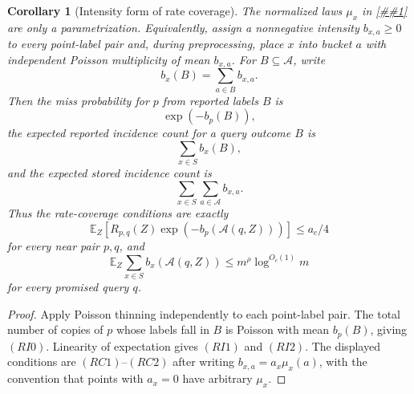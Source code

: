 \documentclass[10pt]{article}
\newcommand{\cref}[1]{\ref{##1}}
\newtheorem{corollary}[theorem]{Corollary}
\theoremstyle{definition}
\newcommand{\E}{\mathbb{E}}
\begin{document}
\begin{corollary}[Intensity form of rate coverage]
   \label{cor:rate-coverage-intensity}
   The normalized laws \(\mu_x\) in \cref{lem:poisson-rate-coverage} are only a
   parametrization.  Equivalently, assign a nonnegative intensity
   \(b_{x,a}\ge0\) to every point-label pair and, during preprocessing, place
   \(x\) into bucket \(a\) with independent Poisson multiplicity of mean
   \(b_{x,a}\).  For \(B\subseteq\mathcal A\), write
   \[
      b_x(B)=\sum_{a\in B}b_{x,a}.
   \]
   Then the miss probability for \(p\) from reported labels \(B\) is
   \[
      \exp(-b_p(B)),
      \tag{RI0}
   \]
   the expected reported incidence count for a query outcome \(B\) is
   \[
      \sum_{x\in S}b_x(B),
      \tag{RI1}
   \]
   and the expected stored incidence count is
   \[
      \sum_{x\in S}\sum_{a\in\mathcal A}b_{x,a}.
      \tag{RI2}
   \]
   Thus the rate-coverage conditions are exactly
   \[
      \E_Z\left[
         R_{p,q}(Z)\exp(-b_p(\mathcal A(q,Z)))
      \right]\le a_c/4
      \tag{RI3}
   \]
   for every near pair \(p,q\), and
   \[
      \E_Z
      \sum_{x\in S}b_x(\mathcal A(q,Z))
      \le m^\rho\log^{O_c(1)}m
      \tag{RI4}
   \]
   for every promised query \(q\).
\end{corollary}

\begin{proof}
   Apply Poisson thinning independently to each point-label pair.  The total
   number of copies of \(p\) whose labels fall in \(B\) is Poisson with mean
   \(b_p(B)\), giving \((RI0)\).  Linearity of expectation gives
   \((RI1)\) and \((RI2)\).  The displayed conditions are \((RC1)\)--\((RC2)\)
   after writing \(b_{x,a}=a_x\mu_x(a)\), with the convention that points with
   \(a_x=0\) have arbitrary \(\mu_x\).
\end{proof}
\end{document}
